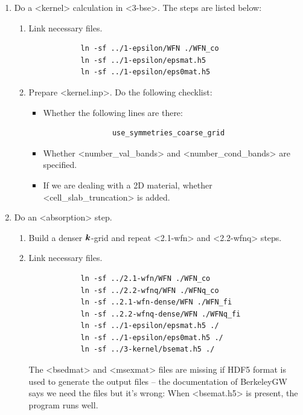 \documentclass[hyperref, a4paper]{report}
\def\texttt#1{<#1>}%
\newcommand{\shortcode}[1]{\texttt{#1}}
\begin{document}
\begin{enumerate}
    \item Do a \shortcode{kernel} calculation in \shortcode{3-bse}. The steps are listed below:
    \begin{enumerate}
        \item Link necessary files.
        \begin{lstlisting}
            ln -sf ../1-epsilon/WFN ./WFN_co
            ln -sf ../1-epsilon/epsmat.h5 
            ln -sf ../1-epsilon/eps0mat.h5     
        \end{lstlisting}
        \item Prepare \shortcode{kernel.inp}. Do the following checklist:
        \begin{itemize}
            \item Whether the following lines are there:
            \begin{lstlisting}
                use_symmetries_coarse_grid
            \end{lstlisting}
            \item Whether \shortcode{number_val_bands} and \shortcode{number_cond_bands}
            are specified.
            \item If we are dealing with a 2D material,
            whether \shortcode{cell_slab_truncation} is added.
        \end{itemize}
    \end{enumerate}
    \item Do an \shortcode{absorption} step. 
    \begin{enumerate}
        \item Build a denser $\vb*{k}$-grid 
        and repeat \shortcode{2.1-wfn} and \shortcode{2.2-wfnq} steps.
        \item Link necessary files.
        \begin{lstlisting}
            ln -sf ../2.1-wfn/WFN ./WFN_co
            ln -sf ../2.2-wfnq/WFN ./WFNq_co
            ln -sf ..2.1-wfn-dense/WFN ./WFN_fi
            ln -sf ..2.2-wfnq-dense/WFN ./WFNq_fi
            ln -sf ../1-epsilon/epsmat.h5 ./
            ln -sf ../1-epsilon/eps0mat.h5 ./
            ln -sf ../3-kernel/bsemat.h5 ./ 
        \end{lstlisting}
        The \shortcode{bsedmat} and \shortcode{msexmat} files are missing 
        if HDF5 format is used to generate the output files -- 
        the documentation of BerkeleyGW says we need the files but it's wrong:
        When \shortcode{bsemat.h5} is present, the program runs well.

\end{enumerate}
\end{enumerate}
\end{document}
